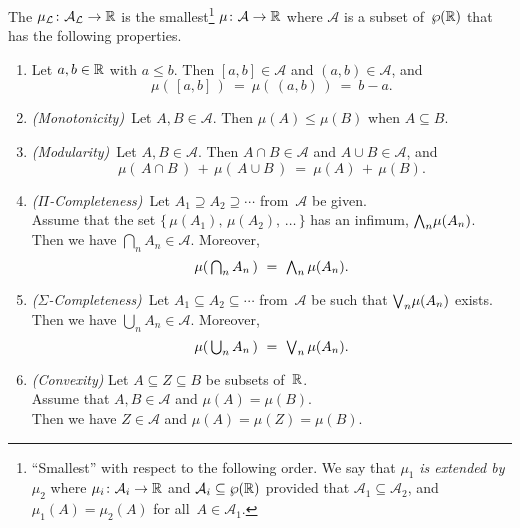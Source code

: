 \documentclass[main.tex]{subfiles}
\begin{document}
\begin{dfn}
\label{D:lebesgue-measure}
The 
$\mu_{\mathcal{L}} \colon \mathcal{A}_{\mathcal{L}} \rightarrow \mathbb{R}$
is the smallest\footnote{%
``Smallest'' with respect to the following order.
We say that $\mu_1$ \emph{is extended by}~$\mu_2$
where $\mu_i\colon \mathcal{A}_i \rightarrow \mathbb{R}$
and $\mathcal{A}_i \subseteq \wp(\mathbb{R})$
provided that
$\mathcal{A}_1 \subseteq \mathcal{A}_2$,
and $\mu_1(A) = \mu_2(A)$
for all~$A\in\mathcal{A}_1$.}
$\mu\colon \mathcal{A} \rightarrow \mathbb{R}$
where $\mathcal{A}$ is a subset of~$\wp(\mathbb{R})$
that has the following properties.
\begin{enumerate}
\item
\label{prop:measure-1}
Let $a,b\in\mathbb{R}$ with $a\leq b$. Then $[a,b]\in\mathcal{A}$
and $(a,b)\in\mathcal{A}$, 
and
\begin{equation*}
\mu(\,[a,b]\,)
\ = \ \mu(\,(a,b)\,)
\ =\ b-a.
\end{equation*}

\item
\label{prop:measure-2}
\textit{(Monotonicity)}\ 
Let $A,B\in \mathcal{A}$.
Then $\mu(A)\leq \mu(B)$
when  $A\subseteq B$.

\item
\label{prop:measure-3}
\textit{(Modularity)}\ 
Let $A,B\in \mathcal{A}$.
Then $A\cap B\in\mathcal{A}$ and $A\cup B \in \mathcal{A}$, and
\begin{equation*}
\mu(\,A\cap B\,)\,+\,\mu(\,A\cup B\,)\ =\ \mu(A)\,+\,\mu(B).
\end{equation*}

\item
\label{prop:measure-4}
\textit{($\Pi$-Completeness)}\ 
Let $A_1 \supseteq A_2 \supseteq \dotsb$
from~$\mathcal{A}$ be given.\\
Assume that the set $\{\,\mu(A_1),\, \mu(A_2),\, \dotsc\,\}$
has an infimum, $\textstyle{\bigwedge}_n \mu(A_n)$.\\
Then we have $\bigcap_n A_n \in \mathcal{A}$.
Moreover,
\begin{equation*}
\mu(\, \textstyle{ \bigcap_n A_n }\,) \ =\ \textstyle{\bigwedge}_n \,\mu(A_n).
\end{equation*}

\item
\label{prop:measure-5}
\textit{($\Sigma$-Completeness)}\ 
Let $A_1 \subseteq A_2 \subseteq \dotsb$
from~$\mathcal{A}$ 
be such that $\textstyle{\bigvee}_n \mu(A_n)$ exists.\\
Then we have $\bigcup_n A_n \in \mathcal{A}$.
Moreover,
\begin{equation*}
\mu(\, \textstyle{ \bigcup_n A_n }\,) \ =\ \textstyle{\bigvee}_n \,\mu(A_n).
\end{equation*}

\item
\label{prop:measure-6}
\textit{(Convexity)}
Let $A\subseteq Z \subseteq B$ be subsets of~$\mathbb{R}$.\\
Assume that $A,B\in\mathcal{A}$ and $\mu(A)=\mu(B)$.\\
Then we have $Z\in \mathcal{A}$ and $\mu(A) = \mu(Z)= \mu(B)$.
\end{enumerate}
\end{dfn}
\end{document}
